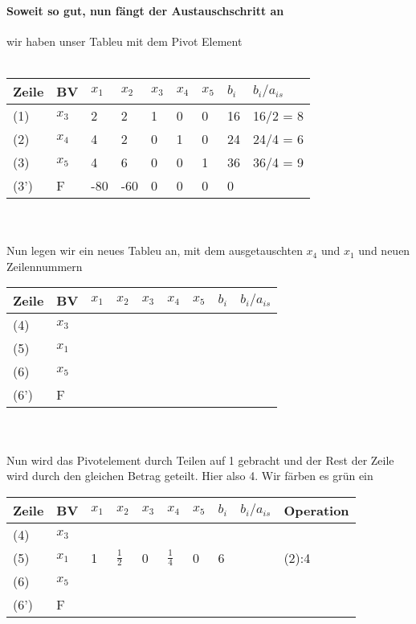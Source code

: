 \documentclass{article}
\begin{document}
\paragraph{Soweit so gut, nun fängt der Austauschschritt an}
wir haben unser Tableu mit dem Pivot Element\\\\
\begin{tabular}{|l|l|l|l|l|l|l|l|l|}
	\hline
	Zeile & BV & $x_{1}$&$x_{2}$&$x_{3}$&$x_{4}$&$x_{5}$&$b_{i}$&$b_{i}/a_{is}$\\
	\hline
	(1)&$x_{3}$&2&2&1&0&0&16&16/2 = 8\\
	\hline
	(2)&$x_{4}$&\cellcolor{green}4&2&0&1&0&24&24/4 = 6\\
	\hline
	(3)&$x_{5}$&4&6&0&0&1&36&36/4 = 9\\
	\hline
	(3')&F&-80&-60&0&0&0&0&\\
	\hline
\end{tabular}\\\\
Nun legen wir ein neues Tableu an, mit dem ausgetauschten $x_{4}$ und $x_{1}$ und neuen Zeilennummern\\
\begin{tabular}{|l|l|l|l|l|l|l|l|l|}
	\hline
	Zeile & BV &\cellcolor{blue} $x_{1}$&$x_{2}$&$x_{3}$&$x_{4}$&$x_{5}$&$b_{i}$&$b_{i}/a_{is}$\\
	\hline
	(4)&$x_{3}$&&&&&&&\\
	\hline
	(5)&\cellcolor{blue}$x_{1}$&&&&&&&\\
	\hline
	(6)&$x_{5}$&&&&&&&\\
	\hline
	(6')&F&&&&&&&\\
	\hline
\end{tabular}\\\\
Nun wird das Pivotelement durch Teilen auf 1 gebracht und der Rest der Zeile wird durch den gleichen Betrag geteilt. Hier also 4. Wir färben es grün ein\\ 
\begin{tabular}{|l|l|l|l|l|l|l|l|l|l|}
	\hline
	Zeile & BV &$x_{1}$&$x_{2}$&$x_{3}$&$x_{4}$&$x_{5}$&$b_{i}$&$b_{i}/a_{is}$&Operation\\
	\hline
	(4)&$x_{3}$&&&&&&&&\\
	\hline
	(5)&$x_{1}$&\cellcolor{green}1&\cellcolor{green}$\frac{1}{2}$&\cellcolor{green}0&\cellcolor{green}$\frac{1}{4}$&\cellcolor{green}0&\cellcolor{green}6&&(2):4\\
	\hline
	(6)&$x_{5}$&&&&&&&&\\
	\hline
	(6')&F&&&&&&&&\\
	\hline
\end{tabular}\\\\
\end{document}
